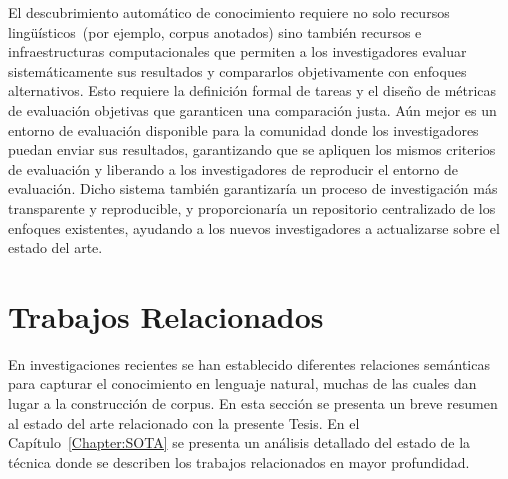 El descubrimiento automático de conocimiento requiere no solo recursos lingüísticos~(por ejemplo, corpus anotados) sino también recursos e infraestructuras computacionales que permiten a los investigadores evaluar sistemáticamente sus resultados y compararlos objetivamente con enfoques alternativos.
Esto requiere la definición formal de tareas y el diseño de métricas de evaluación objetivas que garanticen una comparación justa.
Aún mejor es un entorno de evaluación disponible para la comunidad donde los investigadores puedan enviar sus resultados, garantizando que se apliquen los mismos criterios de evaluación y liberando a los investigadores de reproducir el entorno de evaluación.
Dicho sistema también garantizaría un proceso de investigación más transparente y reproducible, y proporcionaría un repositorio centralizado de los enfoques existentes, ayudando a los nuevos investigadores a actualizarse sobre el estado del arte.

\section{Trabajos Relacionados}
\label{chap1:related}

En investigaciones recientes se han establecido diferentes relaciones semánticas para capturar el conocimiento en lenguaje natural, muchas de las cuales dan lugar a la construcción de corpus.
En esta sección se presenta un breve resumen al estado del arte relacionado con la presente Tesis.
En el Capítulo~\ref{Chapter:SOTA} se presenta un análisis detallado del estado de la técnica donde se describen los trabajos relacionados en mayor profundidad.

